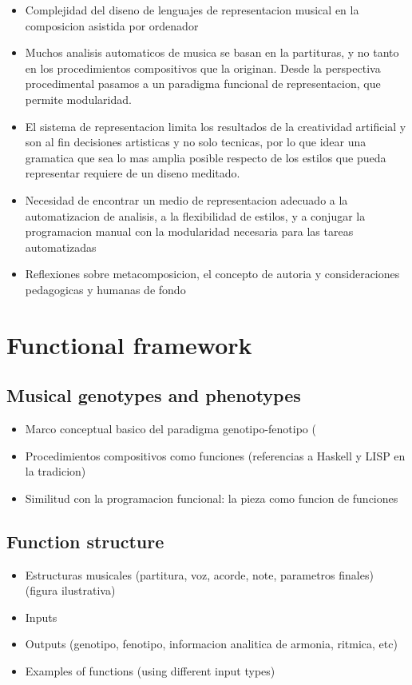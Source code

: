 \documentclass{article}
\begin{document}
\begin{itemize}
\item Complejidad del diseno de lenguajes de representacion musical en la composicion asistida por ordenador

\item Muchos analisis automaticos de musica se basan en la partituras, y no tanto en los procedimientos compositivos que la originan.
Desde la perspectiva procedimental pasamos a un paradigma funcional de representacion, que permite modularidad.

\item El sistema de representacion limita los resultados de la creatividad artificial y son al fin decisiones artisticas y no solo tecnicas, por lo que idear una gramatica que sea lo mas amplia posible respecto de los estilos que pueda representar requiere de un diseno meditado.

\item Necesidad de encontrar un medio de representacion adecuado a la automatizacion de analisis, a la flexibilidad de estilos, y a conjugar la programacion manual con la modularidad necesaria para las tareas automatizadas

\item Reflexiones sobre metacomposicion, el concepto de autoria y consideraciones pedagogicas y humanas de fondo

\end{itemize}




\section{Functional framework}

\subsection{Musical genotypes and phenotypes}
\begin{itemize}
\item Marco conceptual basico del paradigma genotipo-fenotipo (
\item Procedimientos compositivos como funciones (referencias a Haskell y LISP en la tradicion)
\item Similitud con la programacion funcional: la pieza como funcion de funciones
\end{itemize}

\subsection{Function structure}
\begin{itemize}
\item Estructuras musicales (partitura, voz, acorde, note, parametros finales) (figura ilustrativa)
\item Inputs
\item Outputs (genotipo, fenotipo, informacion analitica de armonia, ritmica, etc)
\item Examples of functions (using different input types)

\end{itemize}
\end{document}
